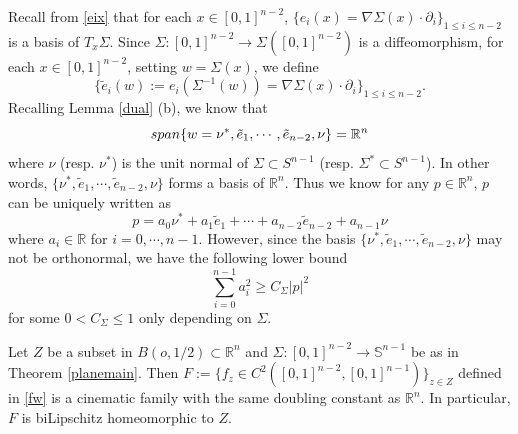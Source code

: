 \documentclass[10pt,a4paper]{amsart}
\newcommand{\R}{\mathbb{R}}
\begin{document}
\begin{remark}\label{basis}
Recall from \eqref{eix} that for each $x \in [0,1]^{n-2}$, $\{e_i(x)= \nabla\Sigma(x)\cdot\partial_i\}_{1 \le i \le n-2}$ is a basis of $T_x\Sigma$.
   Since $\Sigma:[0,1]^{n-2} \to \Sigma([0,1]^{n-2})$ is a diffeomorphism, for each $x \in [0,1]^{n-2}$, setting $w=\Sigma(x)$, we define
$$  \{\tilde e_i(w):= e_i(\Sigma^{-1}(w))= \nabla \Sigma(x) \cdot \partial_i\}_{1\le i \le n-2}. $$
Recalling Lemma \ref{dual} (b), we know that
\begin{equation*}
  {\rm span}  \{w=\nu^\ast, \tilde e_1, \cdots, \tilde e_{n-2}, \nu\}  = \mathbb{R}^{n}
\end{equation*}
where $\nu$ (resp. $\nu^\ast$) is the unit normal of $\Sigma \subset S^{n-1}$ (resp. $\Sigma^\ast \subset S^{n-1}$). In other words, $\{\nu^\ast, \tilde e_1, \cdots, \tilde e_{n-2}, \nu\}$ forms a basis of $\R^n$. Thus
we know for any $p \in \R^n$, $p$ can be uniquely written as
$$  p =  a_0 \nu^\ast + a_1 \tilde e_1 + \cdots + a_{n-2} \tilde e_{n-2} + a_{n-1} \nu
$$
where $a_i\in \R$ for $i=0, \cdots, n-1$. However, since the basis $\{\nu^\ast, \tilde e_1, \cdots, \tilde e_{n-2}, \nu\}$ may not be orthonormal, we have the following lower bound
$$  \sum_{i=0}^{n-1} a_i^2 \ge C_\Sigma |p|^2  $$
for some $0<C_\Sigma \le 1$ only depending on $\Sigma$.
\end{remark}

\begin{lemma} \label{cineprop}
  Let $Z$ be a subset in $B(o,1/2)\subset \mathbb{R}^{n}$ and $\Sigma : [0,1]^{n-2} \to \mathbb{S}^{n-1}$ be as in Theorem \ref{planemain}. Then  $F:=\{f_{z} \in C^2( [0,1]^{n-2},[0,1]^{n-1})\}_{z \in Z}$ defined in \eqref{fw} is a cinematic family with the same doubling constant as $\mathbb{R}^{n}$. In particular, $F$ is biLipschitz homeomorphic to $Z$.
\end{lemma}
\end{document}

